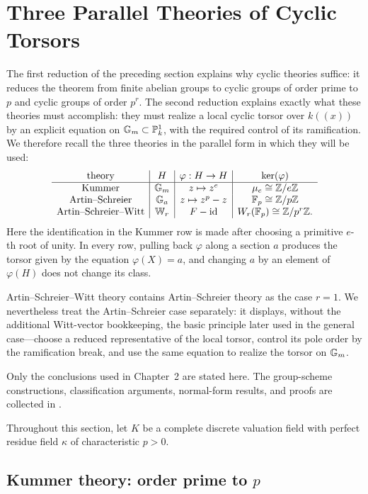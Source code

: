 \section{Three Parallel Theories of Cyclic Torsors}
\label{section:cyclic_extension_theories}
\providecommand{\bW}{\mathbb{W}}

The first reduction of the preceding section explains why cyclic theories
suffice: it reduces the theorem from finite abelian groups to cyclic groups of
order prime to $p$ and cyclic groups of order $p^r$. The second reduction
explains exactly what these theories must accomplish: they must realize a local
cyclic torsor over $k((x))$ by an explicit equation on
$\mathbb{G}_m\subset\mathbb{P}^1_k$, with the required control of its ramification. We
therefore recall the three theories in the parallel form in which they will be
used:
\[
\begin{array}{c|c|c|c}
\text{theory}&H&\varphi:H\to H&\ker(\varphi)\\ \hline
\text{Kummer}&\bG_m&z\mapsto z^e&\mu_e\cong\Z/e\Z\\
\text{Artin--Schreier}&\bG_a&z\mapsto z^p-z&\F_p\cong\Z/p\Z\\
\text{Artin--Schreier--Witt}&\bW_r&F-\mathrm{id}
    &W_r(\F_p)\cong\Z/p^r\Z.
\end{array}
\]
Here the identification in the Kummer row is made after choosing a primitive
$e$-th root of unity. In every row, pulling back $\varphi$ along a section $a$
produces the torsor given by the equation $\varphi(X)=a$, and changing $a$ by
an element of $\varphi(H)$ does not change its class.

Artin--Schreier--Witt theory contains Artin--Schreier theory as the case
$r=1$. We nevertheless treat the Artin--Schreier case separately: it displays,
without the additional Witt-vector bookkeeping, the basic principle later
used in the general case---choose a reduced representative of the local
torsor, control its pole order by the ramification break, and use the same
equation to realize the torsor on $\mathbb{G}_m$.

Only the conclusions used in Chapter~2 are stated here. The group-scheme
constructions, classification arguments, normal-form results, and proofs are
collected in .

Throughout this section, let $K$ be a complete discrete valuation field with
perfect residue field $\kappa$ of characteristic $p>0$.

\subsection{Kummer theory: order prime to \texorpdfstring{$p$}{p}}

